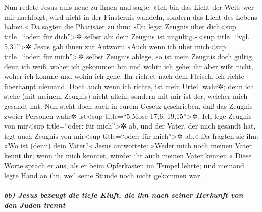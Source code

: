 Nun redete Jesus aufs neue zu ihnen und sagte: »Ich bin
das Licht der Welt: wer mir nachfolgt, wird nicht in der Finsternis
wandeln, sondern das Licht des Lebens haben.«  Da sagten
die Pharisäer zu ihm: »Du legst Zeugnis über dich\textless sup
title=``oder: für dich''\textgreater✲ selbst ab: dein Zeugnis ist
ungültig.«\textless sup title=``vgl. 5,31''\textgreater✲ 
Jesus gab ihnen zur Antwort: »Auch wenn ich über mich\textless sup
title=``oder: für mich''\textgreater✲ selbst Zeugnis ablege, so ist mein
Zeugnis doch gültig, denn ich weiß, woher ich gekommen bin und wohin ich
gehe; ihr aber wißt nicht, woher ich komme und wohin ich gehe.
 Ihr richtet nach dem Fleisch, ich richte überhaupt
niemand.  Doch auch wenn ich richte, ist mein Urteil
wahr✲; denn ich stehe (mit meinem Zeugnis) nicht allein, sondern mit mir
ist der, welcher mich gesandt hat.  Nun steht doch auch
in eurem Gesetz geschrieben, daß das Zeugnis zweier Personen wahr✲
ist\textless sup title=``5.Mose 17,6; 19,15''\textgreater✲.
 Ich lege Zeugnis von mir\textless sup title=``oder: für
mich''\textgreater✲ ab, und der Vater, der mich gesandt hat, legt auch
Zeugnis von mir\textless sup title=``oder: für mich''\textgreater✲ ab.«
 Da fragten sie ihn: »Wo ist (denn) dein Vater?« Jesus
antwortete: »Weder mich noch meinen Vater kennt ihr; wenn ihr mich
kenntet, würdet ihr auch meinen Vater kennen.«  Diese
Worte sprach er aus, als er beim Opferkasten im Tempel lehrte; und
niemand legte Hand an ihn, weil seine Stunde noch nicht gekommen war.

\hypertarget{bb-jesus-bezeugt-die-tiefe-kluft-die-ihn-nach-seiner-herkunft-von-den-juden-trennt}{%
\subparagraph{bb) Jesus bezeugt die tiefe Kluft, die ihn nach seiner
Herkunft von den Juden
trennt}\label{bb-jesus-bezeugt-die-tiefe-kluft-die-ihn-nach-seiner-herkunft-von-den-juden-trennt}}

